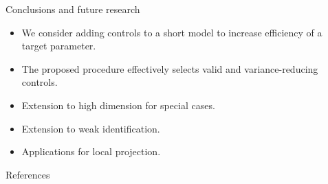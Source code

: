 \documentclass[final]{beamer}
\newlength{\sepwidth}
\newlength{\colwidth}
\newcommand{\separatorcolumn}{\begin{column}{\sepwidth}\end{column}}
\begin{document}
\begin{frame}[t]
\begin{columns}[t]
\begin{column}{\colwidth}
    \begin{block}{Conclusions and future research}
    \vspace{-2mm}
         \begin{itemize}[label = \hookrightarrow]
            \item We consider adding controls to a short model to increase efficiency of a target parameter.
            \item The proposed procedure effectively selects valid and variance-reducing controls.
            \item Extension to high dimension for special cases.
            \item Extension to weak identification.
            \item Applications for local projection.
        \end{itemize}
    \end{block}

\begin{block}{References}

\end{block}

\end{column}

\separatorcolumn
\end{columns}
\end{frame}
\end{document}
